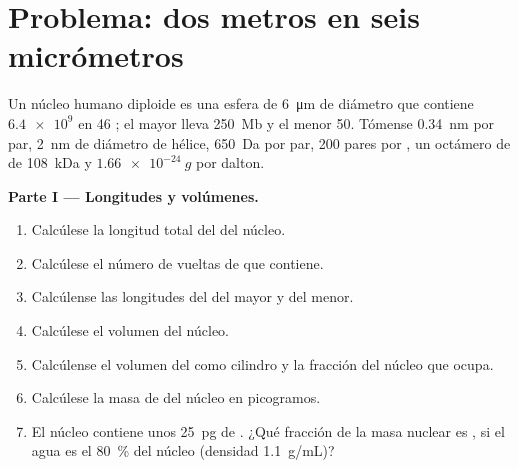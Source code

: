 \section{Problema: dos metros en seis micrómetros}

\begin{problem}
\label{pb:b1:genomes:1}
Un núcleo humano diploide es una esfera de \qty{6}{\micro m} de diámetro que
contiene $\num{6.4e9}$  en 46 ; el  mayor
lleva \qty{250}{Mb} y el menor \qty{50}{}. Tómense \qty{0.34}{nm} por par,
\qty{2}{nm} de diámetro de hélice, \qty{650}{Da} por par, \num{200} pares
por , un octámero de  de \qty{108}{kDa} y
$\qty{1.66e-24}{g}$ por dalton.

\medskip
\noindent\textbf{Parte I --- Longitudes y volúmenes.}
\begin{enumerate}
  \item Calcúlese la longitud total del  del núcleo.
  \item Calcúlese el número de vueltas de  que contiene.
  \item Calcúlense las longitudes del  del  mayor y del menor.
  \item Calcúlese el volumen del núcleo.
  \item Calcúlense el volumen del  como cilindro y la fracción del núcleo
        que ocupa.
  \item Calcúlese la masa de  del núcleo en picogramos.
  \item El núcleo contiene unos \qty{25}{pg} de . ¿Qué fracción de
        la masa nuclear es , si el agua es el \qty{80}{\%} del núcleo
        (densidad \qty{1.1}{g/mL})?
\end{enumerate}


\end{problem}
